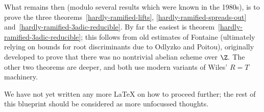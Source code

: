What remains then (modulo several results which were known in the 1980s),
is to prove the three theorems~\ref{hardly-ramified-lifts},
\ref{hardly-ramified-spreads-out} and~\ref{hardly-ramified-3adic-reducible}.
By far the easiest is theorem~\ref{hardly-ramified-3adic-reducible}; this follows
from old estimates of Fontaine (ultimately relying on bounds for root discriminants due to
Odlyzko and Poitou), originally developed to prove that there was no
nontrivial abelian scheme over $\Z.$ The other two theorems are deeper, and both use
modern variants of Wiles' $R=T$ machinery.

We have not yet written any more LaTeX on how to proceed further; the rest of
this blueprint should be considered as more unfocussed thoughts.
